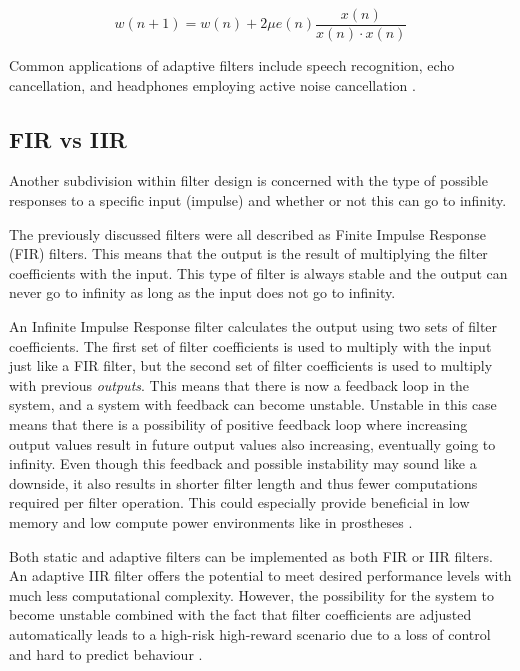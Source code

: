 \begin{equation}\label{eq:adaptive4}
    w(n+1) = w(n) + 2 \mu e(n)  \frac{x(n)}{x(n) \cdot x(n)}
\end{equation}

Common applications of adaptive filters include speech recognition, echo cancellation, and headphones employing active noise cancellation \cite{active_noise_cancellation_wiener_filter,wiener_vs_adaptive_realtime_noisecancellation}.

\subsection{FIR vs IIR}
Another subdivision within filter design is concerned with the type of possible responses to a specific input (impulse) and whether or not this can go to infinity.

The previously discussed filters were all described as Finite Impulse Response (FIR) filters. This means that the output is the result of multiplying the filter coefficients with the input. This type of filter is always stable and the output can never go to infinity as long as the input does not go to infinity.

An Infinite Impulse Response filter calculates the output using two sets of filter coefficients. The first set of filter coefficients is used to multiply with the input just like a FIR filter, but the second set of filter coefficients is used to multiply with previous \textit{outputs}. This means that there is now a feedback loop in the system, and a system with feedback can become unstable. Unstable in this case means that there is a possibility of positive feedback loop where increasing output values result in future output values also increasing, eventually going to infinity. Even though this feedback and possible instability may sound like a downside, it also results in shorter filter length and thus fewer computations required per filter operation. This could especially provide beneficial in low memory and low compute power environments like in prostheses \cite{fir_vs_iir}.

Both static and adaptive filters can be implemented as both FIR or IIR filters. An adaptive IIR filter offers the potential to meet desired performance levels with much less computational complexity. However, the possibility for the system to become unstable combined with the fact that filter coefficients are adjusted automatically leads to a high-risk high-reward scenario due to a loss of control and hard to predict behaviour \cite{digital_signal_processing_handbook}.

